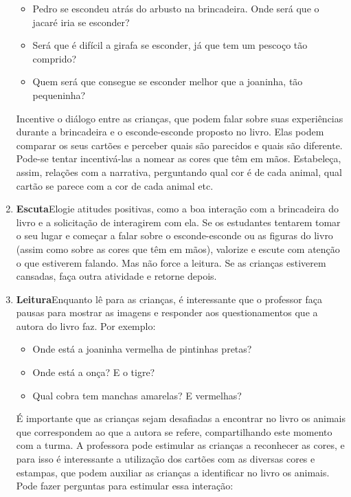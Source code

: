 \documentclass[11pt]{extarticle}
\begin{document}
\begin{enumerate}
\begin{itemize}
\item Pedro se escondeu atrás do arbusto na brincadeira. Onde será que o jacaré iria se esconder?
\item Será que é difícil a girafa se esconder, já que tem um pescoço tão comprido?
\item Quem será que consegue se esconder melhor que a joaninha, tão pequeninha?
\end{itemize}

Incentive o diálogo entre as crianças, que podem falar sobre suas experiências durante a brincadeira e o esconde-esconde proposto no livro.
Elas podem comparar os seus cartões e perceber quais são parecidos e quais são diferente. Pode-se tentar incentivá-las a nomear as cores que têm em mãos.
Estabeleça, assim, relações com a narrativa, perguntando qual cor é de cada animal, qual cartão se parece com a cor de cada animal etc.




\item \textbf{Escuta}\quad Elogie atitudes positivas, como 
a boa interação com a brincadeira do livro e a solicitação de interagirem com ela. Se os estudantes tentarem 
tomar o seu lugar e começar a falar sobre o esconde-esconde ou as figuras do livro (assim como sobre as cores que têm em mãos), valorize e escute com atenção o que estiverem falando. Mas não  force a leitura. Se as crianças estiverem cansadas, faça outra atividade 
e retorne depois. 

\item \textbf{Leitura}\quad Enquanto lê para as crianças, é interessante que o professor faça pausas para mostrar as imagens e responder aos questionamentos que a autora do livro faz. Por exemplo:

\begin{itemize}
\item Onde está a joaninha vermelha de pintinhas pretas?
\item Onde está a onça? E o tigre?
\item Qual cobra tem manchas amarelas? E vermelhas?
\end{itemize}

É importante que as crianças sejam desafiadas a encontrar no livro os animais que correspondem ao que a autora se refere, compartilhando este momento com a turma. A professora pode estimular as crianças a reconhecer as cores, e para isso é interessante a utilização dos cartões com as diversas cores e estampas, que podem auxiliar as crianças a identificar no livro os animais. 
Pode fazer perguntas para estimular essa interação:



\end{enumerate}
\end{document}
